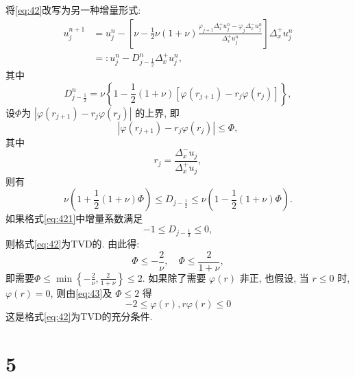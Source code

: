\documentclass[12pt]{article}
\begin{document}
将\cref{eq:42}改写为另一种增量形式:
\begin{equation}
\begin{aligned}
u_{j}^{n+1} &=u_{j}^{n}-\left[\nu-\frac{1}{2} \nu(1+\nu) \frac{\varphi_{j+1} \Delta_{x}^{+} u_{j}^{n}-\varphi_{j} \Delta_{x}^{-} u_{j}^{n}}{\Delta_{x}^{+} u_{j}^{n}}\right] \Delta_{x}^{+} u_{j}^{n} \\
&=: u_{j}^{n}-D_{j-\frac{1}{2}}^{n} \Delta_{x}^{+} u_{j}^{n},
\end{aligned}
\label{eq:421}
\end{equation}
其中
\begin{equation}
D_{j-\frac{1}{2}}^{n}=\nu\left\{1-\frac{1}{2}(1+\nu)\left[\varphi\left(r_{j+1}\right)-r_j \varphi\left(r_{j}\right)\right]\right\},
\end{equation}
设$\Phi$为 $\left|\varphi\left(r_{j+1}\right)- r_j\varphi\left(r_{j}\right)\right|$ 的上界, 即
\begin{equation}
\left|\varphi\left(r_{j+1}\right) - r_j\varphi\left(r_{j}\right)\right| \leqslant \Phi,
\label{eq:43}
\end{equation}
其中
\begin{equation}
	r_j = \frac{\Delta^-_x u_j}{\Delta^+_x u_j},
\end{equation}
则有
\begin{equation}
\nu\left(1+\frac{1}{2}(1+\nu) \Phi\right) \leqslant D_{j-\frac{1}{2}} \leqslant \nu\left(1-\frac{1}{2}(1+\nu) \Phi\right).
\end{equation}
如果格式\cref{eq:421}中增量系数满足
\begin{equation}
-1 \leqslant D_{j-\frac{1}{2}} \leqslant 0,
\end{equation}
则格式\cref{eq:42}为TVD的. 由此得:
\begin{equation}
\Phi \leqslant -\frac{2}{\nu}, \quad \Phi \leqslant \frac{2}{1+\nu},
\end{equation}
即需要$\Phi \leqslant \min \left\{ -\frac{2}{\nu}, \frac{2}{1+\nu}\right\} \leqslant 2 .$
如果除了需要 $\varphi(r)$ 非正, 也假设, 当 $r \leqslant 0$ 时, $\varphi(r)=0$, 则由\cref{eq:43}及 $\Phi \leqslant 2$ 得
\begin{equation}
-2 \leqslant \varphi(r), r\varphi(r) \leqslant 0
\end{equation}
这是格式\cref{eq:42}为TVD的充分条件.



\section{5}
\end{document}
